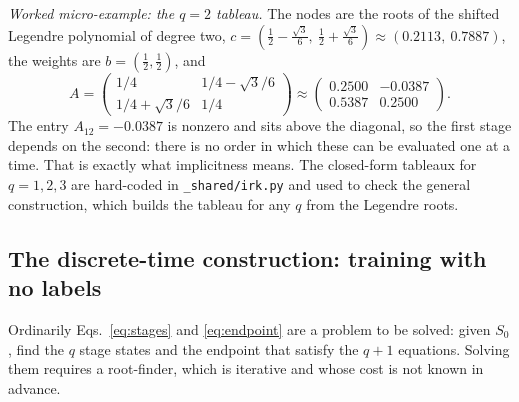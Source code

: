 \documentclass[11pt,a4paper]{article}
\begin{document}
\emph{Worked micro-example: the $q = 2$ tableau.} The nodes are the roots of the
shifted Legendre polynomial of degree two,
$c = \left(\tfrac12 - \tfrac{\sqrt3}{6},\ \tfrac12 + \tfrac{\sqrt3}{6}\right)
 \approx (0.2113,\ 0.7887)$, the weights are $b = (\tfrac12, \tfrac12)$, and
%
\begin{equation}
  A = \begin{pmatrix}
        1/4 & 1/4 - \sqrt3/6 \\[2pt]
        1/4 + \sqrt3/6 & 1/4
      \end{pmatrix}
    \approx \begin{pmatrix}
        0.2500 & -0.0387 \\[2pt]
        0.5387 & 0.2500
      \end{pmatrix}.
  \label{eq:tableau2}
\end{equation}
%
The entry $A_{12} = -0.0387$ is nonzero and sits above the diagonal, so the
first stage depends on the second: there is no order in which these can be
evaluated one at a time. That is exactly what implicitness means. The
closed-form tableaux for $q = 1, 2, 3$ are hard-coded in
\texttt{\_shared/irk.py} and used to check the general construction, which
builds the tableau for any $q$ from the Legendre roots.

\subsection{The discrete-time construction: training with no labels}
\label{sec:construction}

Ordinarily Eqs.~\eqref{eq:stages} and \eqref{eq:endpoint} are a problem to be
solved: given $S_0$, find the $q$ stage states and the endpoint that satisfy the
$q + 1$ equations. Solving them requires a root-finder, which is iterative and
whose cost is not known in advance.
\end{document}

